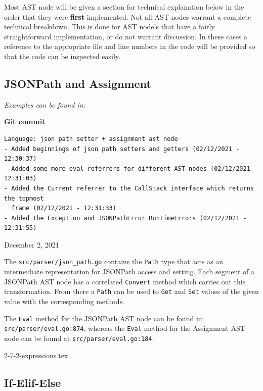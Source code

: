 \documentclass[]{full}
\theoremstyle{definition}
\begin{document}
Most AST node will be given a section for technical explanation below in the order that they were \textbf{first} implemented. Not all AST nodes warrant a complete technical breakdown. This is done for AST node's that have a fairly straightforward implementation, or do not warrant discussion. In these cases a reference to the appropriate file and line numbers in the code will be provided so that the code can be inspected easily.

\subsection{JSONPath and Assignment}

\textit{Examples can be found in: }

\begin{center}
    \textbf{Git commit}
    \begin{verbatim}
Language: json path setter + assignment ast node
- Added beginnings of json path setters and getters (02/12/2021 - 12:30:37)
- Added some more eval referrers for different AST nodes (02/12/2021 - 12:31:03)
- Added the Current referrer to the CallStack interface which returns the topmost
  frame (02/12/2021 - 12:31:33)
- Added the Exception and JSONPathError RuntimeErrors (02/12/2021 - 12:31:55)
    \end{verbatim}
    \vspace{-1em}
    \tiny{December 2, 2021}
\end{center}

The \verb|src/parser/json_path.go| contains the \verb|Path| type that acts as an intermediate representation for JSONPath access and setting. Each segment of a JSONPath AST node has a correlated \verb|Convert| method which carries out this transformation. From there a \verb|Path| can be used to \verb|Get| and \verb|Set| values of the given value with the corresponding methods.

The \verb|Eval| method for the JSONPath AST node can be found in: \verb|src/parser/eval.go:874|, whereas the \verb|Eval| method for the Assignment AST node can be found at \verb|src/parser/eval.go:184|.

{2-7-2-expressions.tex}

\subsection{If-Elif-Else}
\end{document}
